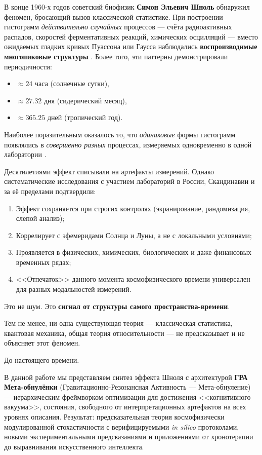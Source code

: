 \documentclass[12pt,a4paper]{article}
\theoremstyle{plain}
\theoremstyle{definition}
\theoremstyle{remark}
\begin{document}
В конце 1960-х годов советский биофизик \textbf{Симон Эльевич Шноль} обнаружил феномен, бросающий вызов классической статистике. При построении гистограмм \emph{действительно случайных} процессов --- счёта радиоактивных распадов, скоростей ферментативных реакций, химических осцилляций --- вместо ожидаемых гладких кривых Пуассона или Гаусса наблюдались \textbf{воспроизводимые многопиковые структуры} \cite{shnoll2009patterns}. Более того, эти паттерны демонстрировали периодичности:
\begin{itemize}
    \item $\approx 24$ часа (солнечные сутки),
    \item $\approx 27.32$ дня (сидерический месяц),
    \item $\approx 365.25$ дней (тропический год).
\end{itemize}
Наиболее поразительным оказалось то, что \emph{одинаковые} формы гистограмм появлялись в \emph{совершенно разных} процессах, измеряемых одновременно в одной лаборатории \cite{rubin2004cosmophysical}.

Десятилетиями эффект списывали на артефакты измерений. Однако систематические исследования с участием лабораторий в России, Скандинавии и за её пределами подтвердили:
\begin{enumerate}
    \item Эффект сохраняется при строгих контролях (экранирование, рандомизация, слепой анализ);
    \item Коррелирует с эфемеридами Солнца и Луны, а не с локальными условиями;
    \item Проявляется в физических, химических, биологических и даже финансовых временных рядах;
    \item <<Отпечаток>> данного момента космофизического времени универсален для разных модальностей измерений.
\end{enumerate}

Это не шум. Это \textbf{сигнал от структуры самого пространства-времени}.

Тем не менее, ни одна существующая теория --- классическая статистика, квантовая механика, общая теория относительности --- не предсказывает и не объясняет этот феномен.

До настоящего времени.

В данной работе мы представляем синтез эффекта Шноля с архитектурой \textbf{ГРА Мета-обнулёнки} (Гравитационно-Резонансная Активность --- Мета-обнуление) --- иерархическим фреймворком оптимизации для достижения <<когнитивного вакуума>>, состояния, свободного от интерпретационных артефактов на всех уровнях описания. Результат: предсказательная теория космофизически модулированной стохастичности с верифицируемыми \textit{in silico} протоколами, новыми экспериментальными предсказаниями и приложениями от хронотерапии до выравнивания искусственного интеллекта.
\end{document}
